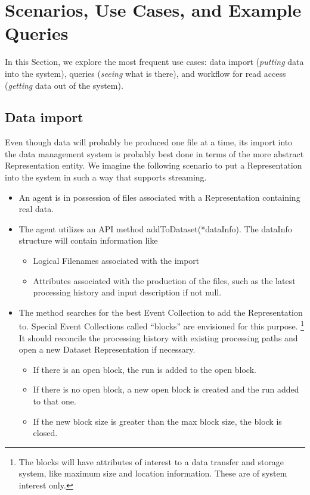 \documentclass{cmspaper}
\begin{document}
\section{Scenarios, Use Cases, and Example Queries}

In this Section, we explore the most frequent use cases: data import
({\em putting} data into the system), queries ({\em seeing} what is there),
and workflow for read access ({\em getting} data out of the system).

\subsection{Data import}

Even though data will probably be produced one file at a time, its import  
into the data management system is probably best done in terms of the 
more abstract Representation entity. We imagine the 
following scenario to put  a Representation 
into the system in such a way that supports streaming.

\begin{itemize}
\item An agent is in possession of files associated with a Representation
containing real data.
\item The agent utilizes an API method addToDataset(*dataInfo).  The dataInfo structure 
will contain information like 
\begin{itemize}
\item Logical Filenames associated with the import
\item Attributes associated with the production of the files, such as 
the latest processing history and input description if not null. 
\end{itemize}
\item The method searches for the best Event Collection to add the Representation to.  
Special Event Collections called ``blocks'' are envisioned for this purpose.  
\footnote{The blocks will have attributes of interest to a data transfer and storage 
system, like maximum size and location information. These are of system interest only.}
It should reconcile the processing history with existing processing paths and 
open a new Dataset Representation if necessary.
\begin{itemize}
\item If there is an open block, the run is added to the open block.
\item If there is no open block, a new open block is created and the run added to that one.
\item If the new block size is greater than the max block size, the block is closed.  
\end{itemize}
\end{itemize}
\end{document}
